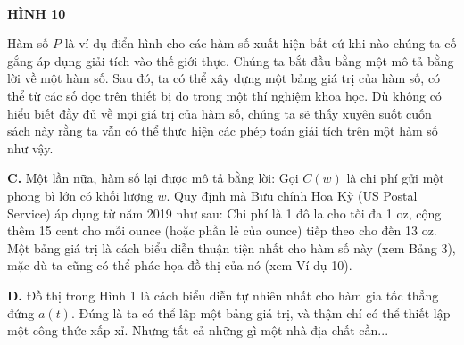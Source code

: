 \begin{minipage}[t]{0.708\textwidth}
\begin{center}
\\[2pt]
        \textbf{\textsf{HÌNH 10}}
    \end{center}

    \vspace{2pt}
    \noindent
    Hàm số $P$ là ví dụ điển hình cho các hàm số xuất hiện bất cứ khi nào chúng ta cố gắng áp dụng giải tích vào thế giới thực. Chúng ta bắt đầu bằng một mô tả bằng lời về một hàm số. Sau đó, ta có thể xây dựng một bảng giá trị của hàm số, có thể từ các số đọc trên thiết bị đo trong một thí nghiệm khoa học. Dù không có hiểu biết đầy đủ về mọi giá trị của hàm số, chúng ta sẽ thấy xuyên suốt cuốn sách này rằng ta vẫn có thể thực hiện các phép toán giải tích trên một hàm số như vậy.

    \vspace{4pt}
    \noindent
    \textbf{C.} Một lần nữa, hàm số lại được mô tả bằng lời: Gọi $C(w)$ là chi phí gửi một phong bì lớn có khối lượng $w$. Quy định mà Bưu chính Hoa Kỳ (US Postal Service) áp dụng từ năm 2019 như sau: Chi phí là 1 đô la cho tối đa 1 oz, cộng thêm 15 cent cho mỗi ounce (hoặc phần lẻ của ounce) tiếp theo cho đến 13 oz. Một bảng giá trị là cách biểu diễn thuận tiện nhất cho hàm số này (xem Bảng 3), mặc dù ta cũng có thể phác họa đồ thị của nó (xem Ví dụ 10).

    \vspace{4pt}
    \noindent
    \textbf{D.} Đồ thị trong Hình 1 là cách biểu diễn tự nhiên nhất cho hàm gia tốc thẳng đứng $a(t)$. Đúng là ta có thể lập một bảng giá trị, và thậm chí có thể thiết lập một công thức xấp xỉ. Nhưng tất cả những gì một nhà địa chất cần...
\end{minipage}